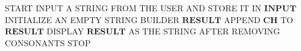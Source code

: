 \begin{algorithm}[H]
\caption{Remove Consonants From a String}
\begin{algorithmic}[1]
\STATE START
\STATE INPUT A STRING FROM THE USER AND STORE IT IN $\textbf{INPUT}$
\STATE INITIALIZE AN EMPTY STRING BUILDER $\textbf{RESULT}$
        \STATE APPEND $\textbf{CH}$ TO $\textbf{RESULT}$
    \ENDIF
\ENDFOR
\STATE DISPLAY $\textbf{RESULT}$ AS THE STRING AFTER REMOVING CONSONANTS
\STATE STOP
\end{algorithmic}
\end{algorithm}
